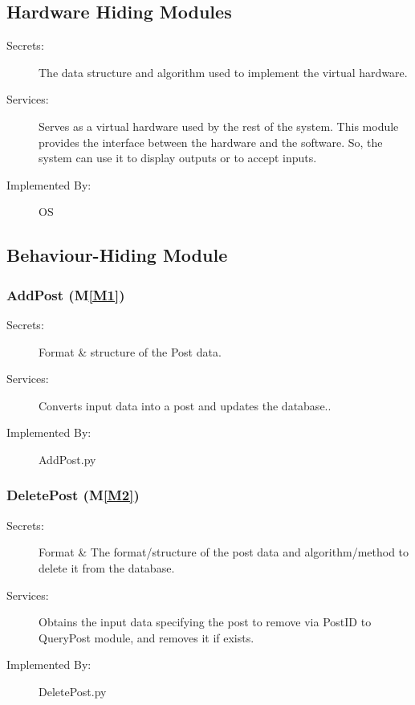 \documentclass[12pt, titlepage]{article}
\newcommand{\mref}[1]{M\ref{#1}}
\begin{document}
\newpage
\subsection{Hardware Hiding Modules }
\begin{description}
\item[Secrets:]The data structure and algorithm used to implement the virtual
  hardware.
\item[Services:]Serves as a virtual hardware used by the rest of the
  system. This module provides the interface between the hardware and the
  software. So, the system can use it to display outputs or to accept inputs.
\item[Implemented By:] OS
\end{description}






\subsection{Behaviour-Hiding Module}

\subsubsection{AddPost (\mref{M1})}

\begin{description}
\item[Secrets:]Format \& structure of the Post data.
\item[Services:]Converts input data into a post and updates the database..
\item[Implemented By:] AddPost.py
\end{description}

\subsubsection{DeletePost (\mref{M2})}

\begin{description}
\item[Secrets:]Format \& The format/structure of the post data and algorithm/method to delete it from the database.
\item[Services:] Obtains the input data specifying the post to remove via PostID to QueryPost module, and removes it if exists.
\item[Implemented By:] DeletePost.py
\end{description}
\end{document}
